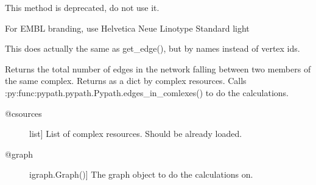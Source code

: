 \documentclass[letterpaper,10pt,english]{sphinxmanual}
\begin{document}
\begin{fulllineitems}

\begin{fulllineitems}
\label{\detokenize{main:pypath.main.PyPath.small_plot}}
This method is deprecated, do not use it.

\end{fulllineitems}


\begin{fulllineitems}
\label{\detokenize{main:pypath.main.PyPath.source_network}}
For EMBL branding, use Helvetica Neue Linotype Standard light

\end{fulllineitems}


\begin{fulllineitems}
\label{\detokenize{main:pypath.main.PyPath.straight_between}}
This does actually the same as get\_edge(), but by names
instead of vertex ids.

\end{fulllineitems}


\begin{fulllineitems}
\label{\detokenize{main:pypath.main.PyPath.sum_in_complex}}
Returns the total number of edges in the network falling
between two members of the same complex.
Returns as a dict by complex resources.
Calls :py:func:pypath.pypath.Pypath.edges\_in\_comlexes()
to do the calculations.
\begin{description}
\item[{@csources}] \leavevmode{[}list{]}
List of complex resources. Should be already loaded.

\item[{@graph}] \leavevmode{[}igraph.Graph(){]}
The graph object to do the calculations on.

\end{description}


\end{fulllineitems}
\end{fulllineitems}
\end{document}
